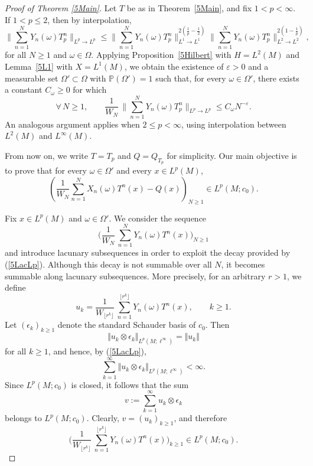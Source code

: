 \documentclass[12pt]{amsart}
\newcommand{\Pdb}{\mbox{$\mathbb{P}$}}
\newcommand{\norm}[1]{\Vert#1\Vert}
\theoremstyle{remark}
\theoremstyle{definition}
\numberwithin{equation}{section}
\begin{document}
\begin{proof}[Proof of Theorem \ref{5Main}]
Let $T$ be as in Theorem~\ref{5Main}, and fix $1<p<\infty$. 
If $1<p\leq 2$, then by interpolation,
\[
\Big\|\sum_{n=1}^N Y_n(\omega) T_p^n\Big\|_{L^p\to L^p}
\leq 
\Big\|\sum_{n=1}^N Y_n(\omega) T_p^n\Big\|_{L^1\to L^1}^{2(\frac1p -\frac12)}
\Big\|\sum_{n=1}^N Y_n(\omega) T_p^n\Big\|_{L^2\to L^2}^{2(1-\frac1p)},
\]
for all $N\geq 1$ and $\omega\in\Omega$.  
Applying Proposition~\ref{5Hilbert} with $H=L^2(M)$ and Lemma~\ref{5L1} with $X=L^1(M)$, we obtain the existence of $\varepsilon>0$ and a measurable set $\Omega'\subset\Omega$ with $\Pdb(\Omega')=1$ such that, for every $\omega\in\Omega'$, there exists a constant $C_\omega\geq 0$ for which
\begin{equation}\label{5LacLp}
\forall\, N\geq 1,\qquad 
\frac{1}{W_N}\,
\Big\|\sum_{n=1}^N Y_n(\omega) T_p^n\Big\|_{L^p\to L^p}
\leq C_\omega N^{-\varepsilon}.
\end{equation}
An analogous argument applies when $2\leq p<\infty$, using interpolation between $L^2(M)$ and $L^\infty(M)$. 

From now on, we write $T = T_p$ and $Q = Q_{T_p}$ for simplicity. Our main objective is to prove that for every $\omega \in \Omega'$ and every $x \in L^p(M)$,
\begin{equation}\label{5Goal}
\left(\frac{1}{W_N}\sum_{n=1}^N X_n(\omega) T^n(x) - Q(x)\right)_{N\geq 1}
\in L^p(M; c_0).
\end{equation}

Fix $x\in L^p(M)$ and $\omega\in\Omega'$. We consider the sequence
\[
\biggl(\frac{1}{W_{N}}\,
\sum_{n=1}^N
Y_n(\omega) T^n(x)\biggr)_{N\geq 1}
\]
and introduce lacunary subsequences in order to exploit the decay provided by (\ref{5LacLp}). Although this decay is not summable over all $N$, it becomes summable along lacunary subsequences. More precisely, for an arbitrary $r>1$, we define 
\[
u_k = 
\frac{1}{W_{\lfloor r^k \rfloor}}\,
\sum_{n=1}^{\lfloor r^k \rfloor} 
Y_n(\omega) T^n(x),\qquad k\geq 1.
\]
Let $(\epsilon_k)_{k\geq 1}$ denote the standard Schauder basis of $c_0$. Then 
\[
\norm{u_k\otimes \epsilon_k}_{L^p(M;\ell^\infty)}
=\norm{u_k}
\]
for all $k\geq 1$, and hence, by (\ref{5LacLp}),
\[
\sum_{k=1}^\infty \norm{u_k\otimes \epsilon_k}_{L^p(M;\ell^\infty)}<\infty.
\]
Since $L^p(M;c_0)$ is closed, it follows that the sum
\[
v:=\sum_{k=1}^\infty u_k\otimes \epsilon_k
\]
belongs to $L^p(M;c_0)$. Clearly, $v=(u_k)_{k\geq 1}$, and therefore
\begin{equation}\label{5Lacun}
\biggl(\frac{1}{W_{\lfloor r^k \rfloor}}\,
\sum_{n=1}^{\lfloor r^k \rfloor} 
Y_n(\omega) T^n(x)\biggr)_{k\geq 1}
\in L^p(M;c_0).
\end{equation}


\end{proof}
\end{document}
